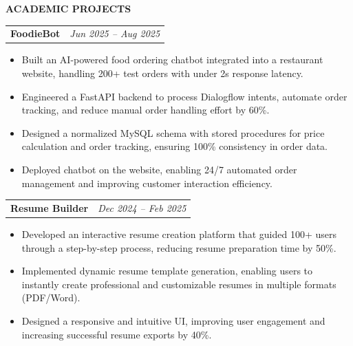 \documentclass[10pt]{article}
\makeatletter
\newcommand{\sectionheader}[1]{%
  \vspace{6pt}%
  \noindent\colorbox{sectiongray}{%
    \parbox[c][10pt]{\dimexpr\textwidth-2\fboxsep}{%
      \vspace*{\fill}%
      {\fontsize{10}{12}\selectfont\bfseries\MakeUppercase{#1}}%
      \vspace*{\fill}%
    }%
  }%
  \vspace{6pt}%
}
\newcommand{\projectentry}[4]{%
  \begin{tabularx}{\textwidth}{@{}X r@{}}
    {\fontsize{10}{12}\selectfont\bfseries #1} \quad{\fontsize{8}{10}\selectfont #2} & {\fontsize{8.5}{11}\selectfont\itshape #4} \\
  \end{tabularx}
  \vspace{-9.5pt}
  #3
  \vspace{5pt}
}
\makeatother
\begin{document}
\sectionheader{Academic Projects}


\projectentry{FoodieBot}{FastAPI, MySQL, Dialogflow, HTML, CSS, JavaScript}{
\begin{itemize}
  \item Built an AI-powered food ordering chatbot integrated into a restaurant website, handling 200+ test orders with under 2s response latency.
  \item Engineered a FastAPI backend to process Dialogflow intents, automate order tracking, and reduce manual order handling effort by 60\%.
  \item Designed a normalized MySQL schema with stored procedures for price calculation and order tracking, ensuring 100\% consistency in order data.
  \item Deployed chatbot on the website, enabling 24/7 automated order management and improving customer interaction efficiency.
\end{itemize}
}{Jun 2025 -- Aug 2025}

\projectentry{Resume Builder}{React, Node.js, MongoDB, HTML, CSS, JavaScript}{
\begin{itemize}
  \item Developed an interactive resume creation platform that guided 100+ users through a step-by-step process, reducing resume preparation time by 50\%.
  \item Implemented dynamic resume template generation, enabling users to instantly create professional and customizable resumes in multiple formats (PDF/Word).
  \item Designed a responsive and intuitive UI, improving user engagement and increasing successful resume exports by 40\%.
\end{itemize}
}{Dec 2024 -- Feb 2025}
\end{document}
